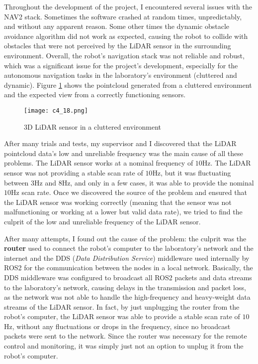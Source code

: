 Throughout the development of the project, I encountered several issues with the NAV2 stack.
Sometimes the software crashed at random times, unpredictably, and without any apparent reason.
Some other times the dynamic obstacle avoidance algorithm did not work as expected, causing the robot to collide
with obstacles that were not perceived by the LiDAR sensor in the surrounding environment.
Overall, the robot's navigation stack was not reliable and robust, which was a significant issue for the project's development,
especially for the autonomous navigation tasks in the laboratory's environment (cluttered and dynamic).
Figure \ref{fig:3dlidar} shows the pointcloud generated from a cluttered environment and the expected view 
from a correctly functioning sensors.

\begin{figure}[t]
    \centering
    \texttt{[image: c4\_18.png]}
    \caption{3D LiDAR sensor in a cluttered environment}
    \label{fig:3dlidar}
\end{figure}

After many trials and tests, my supervisor and I discovered that the LiDAR pointcloud data's low and unreliable frequency
was the main cause of all these problems. The LiDAR sensor works at a nominal frequency of $10$Hz. 
The LiDAR sensor was not providing a stable scan rate of $10$Hz, but it was fluctuating between $3$Hz and $8$Hz, 
and only in a few cases, it was able to provide the nominal $10$Hz scan rate.
Once we discovered the source of the problem and ensured that the LiDAR sensor was working correctly
(meaning that the sensor was not malfunctioning or working at a lower but valid data rate), 
we tried to find the culprit of the low and unreliable frequency of the LiDAR sensor.

After many attempts, I found out the cause of the problem: the culprit was the \textbf{router}
used to connect the robot's computer
to the laboratory's network and the internet and the DDS (\textit{Data Distribution Service}) middleware used 
internally by ROS2 for the communication between the nodes in a local network. Basically, the DDS middleware
was configured to broadcast all ROS2 packets and data streams to the laboratory's network, causing delays in the transmission
and packet loss, as the network was not able to handle the high-frequency and heavy-weight data streams of the LiDAR sensor.
In fact, by just unplugging the router from the robot's computer, the LiDAR sensor was able to provide a stable scan rate
of $10$Hz, without any fluctuations or drops in the frequency, since no broadcast packets were sent to the network.
Since the router was necessary for the remote control and monitoring, it was simply just not an option
to unplug it from the robot's computer.

